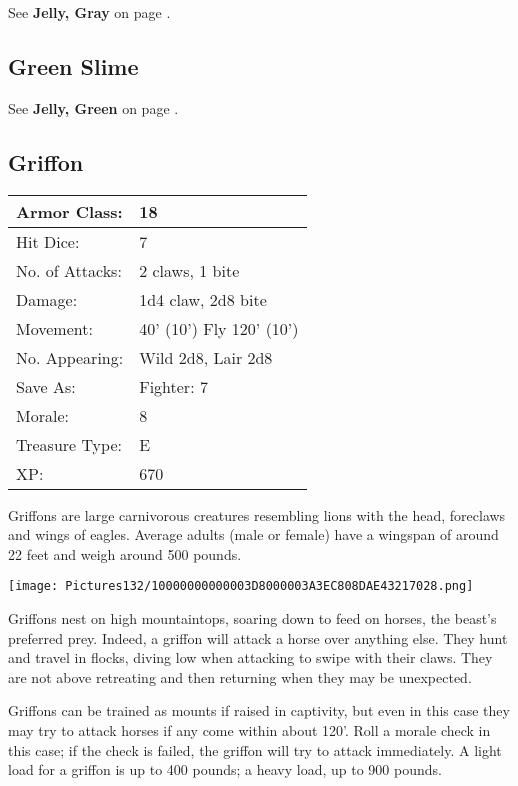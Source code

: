 \documentclass[a4paper,twoside,openany,10pt]{book}
\begin{document}
\begin{multicols}{2}
See \textbf{Jelly, Gray }on page \hyperlink{jelly-gray-gray-ooze}{\pageref{jelly-gray-gray-ooze}}.

\subsection*{Green Slime}\label{green-slime}

See \textbf{Jelly, Green} on page \hyperlink{jelly-green-green-slime}{\pageref{jelly-green-green-slime}}.

\subsection*{Griffon}\label{griffon}

\begin{tabularx}{0.48\textwidth}{@{}lX@{}}
Armor Class: & 18 \\\hline
Hit Dice: & 7 \\\hline
No. of Attacks: & 2 claws, 1 bite \\\hline
Damage: & 1d4 claw, 2d8 bite \\\hline
Movement: & 40' (10') Fly
120' (10') \\\hline
No. Appearing: & Wild 2d8, Lair 2d8 \\\hline
Save As: & Fighter: 7 \\\hline
Morale: & 8 \\\hline
Treasure Type: & E \\\hline
XP: & 670 \\\hline
\end{tabularx}\medskip

Griffons are large carnivorous creatures resembling lions with the head, foreclaws and wings of eagles. Average adults (male or female) have a wingspan of around 22 feet and weigh around 500 pounds.

\begin{center}
	\texttt{[image: Pictures132/10000000000003D8000003A3EC808DAE43217028.png]}
\end{center}

Griffons nest on high mountaintops, soaring down to feed on horses, the beast's preferred prey. Indeed, a griffon will attack a horse over anything else. They hunt and travel in flocks, diving low when attacking to swipe with their claws. They are not above retreating and then returning when they may be unexpected.

Griffons can be trained as mounts if raised in captivity, but even in this case they may try to attack horses if any come within about 120'. Roll a morale check in this case; if the check is failed, the griffon will try to attack immediately. A light load for a griffon is up to 400 pounds; a heavy load, up to 900 pounds.



\end{multicols}
\end{document}
